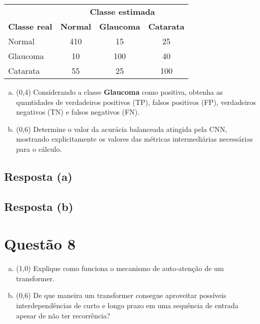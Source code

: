 \documentclass[final,3p]{elsarticle}
\numberwithin{equation}{section}
\begin{document}
    \begin{table}[h]
        \centering
        \begin{tabular}{l c c c}
            \toprule
             & \multicolumn{3}{c}{\textbf{Classe estimada}} \\
            \textbf{Classe real} & \textbf{Normal} & \textbf{Glaucoma} & \textbf{Catarata} \\
            \midrule
            Normal & 410 & 15 & 25 \\
            Glaucoma & 10 & 100 & 40 \\
            Catarata & 55 & 25 & 100 \\
            \bottomrule
        \end{tabular}
    \end{table}

    \begin{enumerate}[(a)]
        \item (0,4) Considerando a classe \textbf{Glaucoma} como positiva, obtenha as quantidades de verdadeiros positivos (TP), falsos positivos (FP), verdadeiros negativos (TN) e falsos negativos (FN).
        \item (0,6) Determine o valor da acurácia balanceada atingida pela CNN, mostrando explicitamente os valores das métricas intermediárias necessárias para o cálculo.
    \end{enumerate}

    \subsection{Resposta \textbf{(a)}}


    \subsection{Resposta \textbf{(b)}}


\section{Questão 8}

    \begin{enumerate}[(a)]
        \item (1,0) Explique como funciona o mecanismo de auto-atenção de um transformer.
        \item (0,6) De que maneira um transformer consegue aproveitar possíveis interdependências de curto e longo prazo em uma sequência de entrada apesar de não ter recorrência?
    \end{enumerate}
\end{document}
